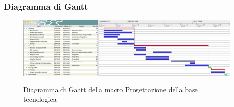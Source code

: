         \begin{landscape}
			\subsubsection{Diagramma di Gantt}        
			\begin{figure}[H]
					\centering
					\includegraphics[scale=0.49]{img/Progettazione_della_base_tecnologica.png}\\
					\caption{Diagramma di Gantt della macro Progettazione della base tecnologica}
			\end{figure}
		\end{landscape}
		\newpage


